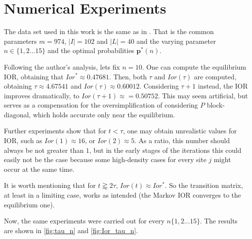 \documentclass{article}
\newcommand{\pp}{\mathbf{p}}
\begin{document}
\section{Numerical Experiments}\label{sec4}
The data set used in this work is the same as in \citep{Carrasco}. That is the common parameters $m = 974$, $|I| = 102$ and $|L| = 40$ and the varying parameter $n \in\{1, 2 \dots 15\}$ and the optimal probabilities $\pp^*(n)$.\par
Following the author's analysis, lets fix $n=10$. One can compute the equilibrium IOR, obtaining that $Ior^* \approx 0.47681$. Then, both $\tau$ and $Ior(\tau)$ are computed, obtaining $\tau \approx 4.67541$ and $Ior(\tau) \approx 0.60012$. Considering $\tau+1$ instead, the IOR improves dramatically, to $Ior(\tau+1) \approx = 0.50752$. This may seem artificial, but serves as a compensation for the  oversimplification of considering $P$ block-diagonal, which holds accurate only near the equilibrium.\par
Further experiments show that for $t < \tau$, one may obtain unrealistic values for IOR, such as $Ior(1) \approx 16$, or $Ior(2) \approx 5$. As a ratio, this number should always be not greater than $1$, but in the early stages of the iterations this could easily not be the case because some high-density cases for every site $j$ might occur at the same time.\par
It is worth mentioning that for $t \gtrapprox 2\tau$, $Ior(t) \approx Ior^*$. So the transition matrix, at least in a limiting case, works as intended (the Markov IOR converges to the equilibrium one).\par
Now, the same experiments were carried out for every $n \{ 1,2 \dots 15\}$. The results are shown in \ref{fig:tau_n} and \ref{fig:Ior_tau_n}.\par
\end{document}
